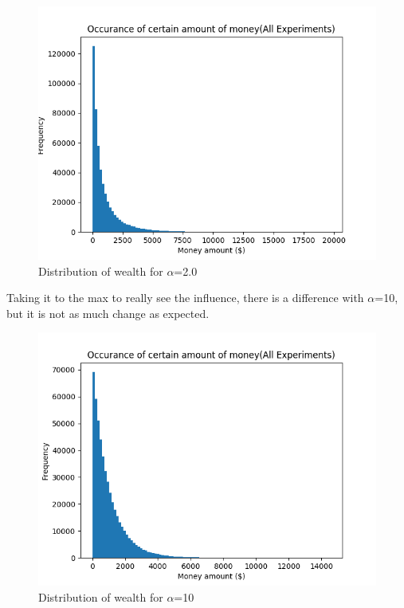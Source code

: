 \documentclass[12pt]{article} %
\begin{document}
\begin{figure} %
	\includegraphics[scale=\scaleResultsC]{a1.5.png} %
	\centering
	\caption{Distribution of wealth for $\alpha$=2.0}
	\label{fig:a2}
\end{figure}


Taking it to the max to really see the influence, there is a difference with
$\alpha$=10, but it is not as much change as expected.

\begin{figure}
	\includegraphics[scale=\scaleResultsC]{a10.png}
	\centering
	\caption{Distribution of wealth for $\alpha$=10}
	\label{fig:a10}
\end{figure}
\end{document}
